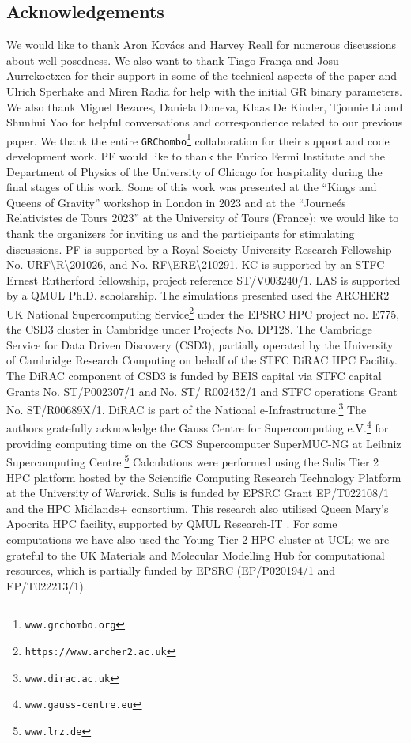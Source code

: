 \documentclass[reprint,aps,amsmath,amssymb,twoside,prd,showkeys,superscriptaddress,nofootinbib]{revtex4-2}
\begin{document}
\subsection*{Acknowledgements}
We would like to thank Aron Kov\'acs and Harvey Reall for numerous discussions about well-posedness. We also want to thank Tiago Fran\c{c}a and Josu Aurrekoetxea for their support in some of the technical aspects of the paper and Ulrich Sperhake and Miren Radia for help with the initial GR binary parameters. We also thank Miguel Bezares, Daniela Doneva, Klaas De Kinder, Tjonnie Li and Shunhui Yao for helpful conversations and correspondence related to our previous paper.
We thank the entire \texttt{GRChombo}\footnote{\texttt{www.grchombo.org}} collaboration for their support and code development work. PF would like to thank the Enrico Fermi Institute and the Department of Physics of the University of Chicago for hospitality during the final stages of this work. Some of this work was presented at the ``Kings and Queens of Gravity'' workshop in London in 2023 and at the ``Journe\'es Relativistes de Tours 2023'' at the University of Tours (France); we would like to thank the organizers for inviting us and the participants for stimulating discussions. PF is supported by a Royal Society University Research Fellowship  No. URF\textbackslash R\textbackslash 201026, and No. RF\textbackslash ERE\textbackslash 210291. KC is supported by an STFC Ernest Rutherford fellowship, project reference ST/V003240/1. LAS is supported by a QMUL Ph.D. scholarship. The simulations presented used the ARCHER2 UK National Supercomputing Service\footnote{\texttt{https://www.archer2.ac.uk}} under the EPSRC HPC project no. E775, the CSD3 cluster in Cambridge under Projects No. DP128. The Cambridge Service for Data Driven Discovery (CSD3), partially operated by the University of Cambridge Research Computing on behalf of the STFC DiRAC HPC Facility. The DiRAC component of CSD3 is funded by BEIS capital via STFC capital Grants No. ST/P002307/1 and No. ST/ R002452/1 and STFC operations Grant No. ST/R00689X/1. DiRAC is part of the National e-Infrastructure.\footnote{\texttt{www.dirac.ac.uk}} The authors gratefully acknowledge the Gauss Centre for Supercomputing e.V.\footnote{\texttt{www.gauss-centre.eu}} for providing computing time on the GCS Supercomputer SuperMUC-NG at Leibniz Supercomputing Centre.\footnote{\texttt{www.lrz.de}} Calculations were performed using the Sulis Tier 2 HPC platform hosted by the Scientific Computing Research Technology Platform at the University of Warwick. Sulis is funded by EPSRC Grant EP/T022108/1 and the HPC Midlands+ consortium. This research also
utilised Queen Mary’s Apocrita HPC facility, supported
by QMUL Research-IT \cite{apocrita}. For some computations we have also used the Young Tier 2 HPC cluster at UCL; we are grateful to the UK Materials
and Molecular Modelling Hub for computational resources, which is partially funded by
EPSRC (EP/P020194/1 and EP/T022213/1).
\end{document}
